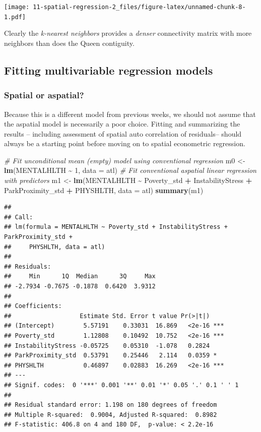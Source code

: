 \documentclass[
]{book}
\newenvironment{Shaded}{\begin{snugshade}}{\end{snugshade}}
\newcommand{\AttributeTok}[1]{\textcolor[rgb]{0.13,0.29,0.53}{#1}}
\newcommand{\CommentTok}[1]{\textcolor[rgb]{0.56,0.35,0.01}{\textit{#1}}}
\newcommand{\DecValTok}[1]{\textcolor[rgb]{0.00,0.00,0.81}{#1}}
\newcommand{\FunctionTok}[1]{\textcolor[rgb]{0.13,0.29,0.53}{\textbf{#1}}}
\newcommand{\NormalTok}[1]{#1}
\newcommand{\OtherTok}[1]{\textcolor[rgb]{0.56,0.35,0.01}{#1}}
\newcommand{\SpecialCharTok}[1]{\textcolor[rgb]{0.81,0.36,0.00}{\textbf{#1}}}
\begin{document}
\texttt{[image: 11-spatial-regression-2\_files/figure-latex/unnamed-chunk-8-1.pdf]}

Clearly the \emph{k-nearest neighbors} provides a \emph{denser} connectivity matrix with more neighbors than does the Queen contiguity.

\hypertarget{fitting-multivariable-regression-models}{%
\subsection{Fitting multivariable regression models}\label{fitting-multivariable-regression-models}}

\hypertarget{spatial-or-aspatial}{%
\subsubsection{Spatial or aspatial?}\label{spatial-or-aspatial}}

Because this is a different model from previous weeks, we should not assume that the aspatial model is necessarily a poor choice. Fitting and summarizing the results -- including assessment of spatial auto correlation of residuals-- should always be a starting point before moving on to spatial econometric regression.

\begin{Shaded}
\begin{Highlighting}[]
\CommentTok{\# Fit unconditional mean (empty) model using conventional regression}
\NormalTok{m0 }\OtherTok{\textless{}{-}} \FunctionTok{lm}\NormalTok{(MENTALHLTH }\SpecialCharTok{\textasciitilde{}} \DecValTok{1}\NormalTok{,}
         \AttributeTok{data =}\NormalTok{ atl)}
\CommentTok{\# Fit conventional aspatial linear regression with predictors}
\NormalTok{m1 }\OtherTok{\textless{}{-}} \FunctionTok{lm}\NormalTok{(MENTALHLTH }\SpecialCharTok{\textasciitilde{}}\NormalTok{ Poverty\_std }\SpecialCharTok{+}\NormalTok{ InstabilityStress }\SpecialCharTok{+}\NormalTok{ ParkProximity\_std  }\SpecialCharTok{+}\NormalTok{ PHYSHLTH,}
         \AttributeTok{data =}\NormalTok{ atl)}
\FunctionTok{summary}\NormalTok{(m1)}
\end{Highlighting}
\end{Shaded}

\begin{verbatim}
## 
## Call:
## lm(formula = MENTALHLTH ~ Poverty_std + InstabilityStress + ParkProximity_std + 
##     PHYSHLTH, data = atl)
## 
## Residuals:
##     Min      1Q  Median      3Q     Max 
## -2.7934 -0.7675 -0.1878  0.6420  3.9312 
## 
## Coefficients:
##                   Estimate Std. Error t value Pr(>|t|)    
## (Intercept)        5.57191    0.33031  16.869   <2e-16 ***
## Poverty_std        1.12808    0.10492  10.752   <2e-16 ***
## InstabilityStress -0.05725    0.05310  -1.078   0.2824    
## ParkProximity_std  0.53791    0.25446   2.114   0.0359 *  
## PHYSHLTH           0.46897    0.02883  16.269   <2e-16 ***
## ---
## Signif. codes:  0 '***' 0.001 '**' 0.01 '*' 0.05 '.' 0.1 ' ' 1
## 
## Residual standard error: 1.198 on 180 degrees of freedom
## Multiple R-squared:  0.9004, Adjusted R-squared:  0.8982 
## F-statistic: 406.8 on 4 and 180 DF,  p-value: < 2.2e-16
\end{verbatim}
\end{document}
